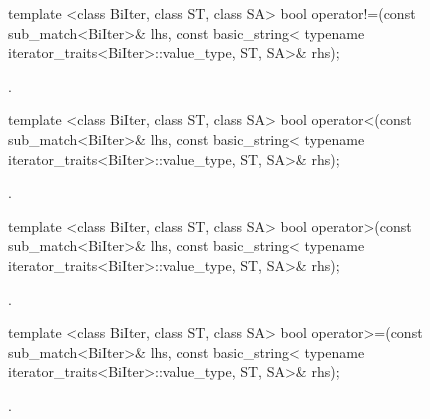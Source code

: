 %
%
\begin{itemdecl}
template <class BiIter, class ST, class SA>
  bool operator!=(const sub_match<BiIter>& lhs,
                  const basic_string<
                    typename iterator_traits<BiIter>::value_type, ST, SA>& rhs);
\end{itemdecl}

\begin{itemdescr}
\pnum\returns  {}.
\end{itemdescr}

%
%
\begin{itemdecl}
template <class BiIter, class ST, class SA>
  bool operator<(const sub_match<BiIter>& lhs,
                 const basic_string<
                   typename iterator_traits<BiIter>::value_type, ST, SA>& rhs);
\end{itemdecl}

\begin{itemdescr}
\pnum\returns  {}.
\end{itemdescr}

%
%
\begin{itemdecl}
template <class BiIter, class ST, class SA>
  bool operator>(const sub_match<BiIter>& lhs,
                 const basic_string<
                   typename iterator_traits<BiIter>::value_type, ST, SA>& rhs);
\end{itemdecl}

\begin{itemdescr}
\pnum\returns  {}.
\end{itemdescr}

%
%
\begin{itemdecl}
template <class BiIter, class ST, class SA>
  bool operator>=(const sub_match<BiIter>& lhs,
                  const basic_string<
                    typename iterator_traits<BiIter>::value_type, ST, SA>& rhs);
\end{itemdecl}

\begin{itemdescr}
\pnum\returns  {}.
\end{itemdescr}

